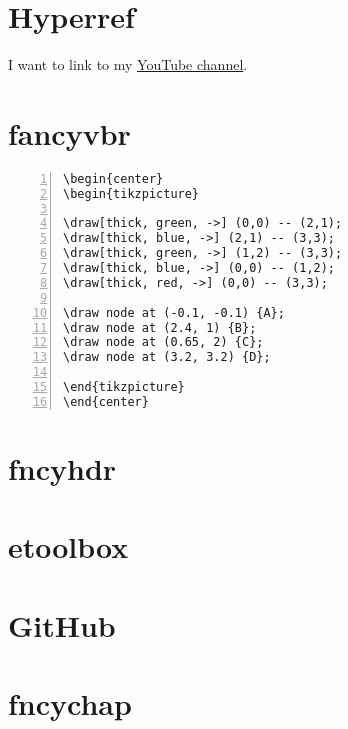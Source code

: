 \documentclass[a4paper]{ctexart}
\begin{document}
\tableofcontents

\newpage


\section{Hyperref} 
I want to link to my \href{https://www.youtube.com/watch?v=dQw4w9WgXcQ}{YouTube channel}. 



\section{fancyvbr}

\begin{Verbatim}[numbers=left, frame=single, formatcom=\color{red}]
\begin{center}
\begin{tikzpicture}

\draw[thick, green, ->] (0,0) -- (2,1);
\draw[thick, blue, ->] (2,1) -- (3,3);
\draw[thick, green, ->] (1,2) -- (3,3);
\draw[thick, blue, ->] (0,0) -- (1,2);
\draw[thick, red, ->] (0,0) -- (3,3);

\draw node at (-0.1, -0.1) {A};
\draw node at (2.4, 1) {B};
\draw node at (0.65, 2) {C};
\draw node at (3.2, 3.2) {D};

\end{tikzpicture}
\end{center}
\end{Verbatim}

\section{fncyhdr}

\section{etoolbox}

\section{GitHub}

\section{fncychap}
\end{document}
